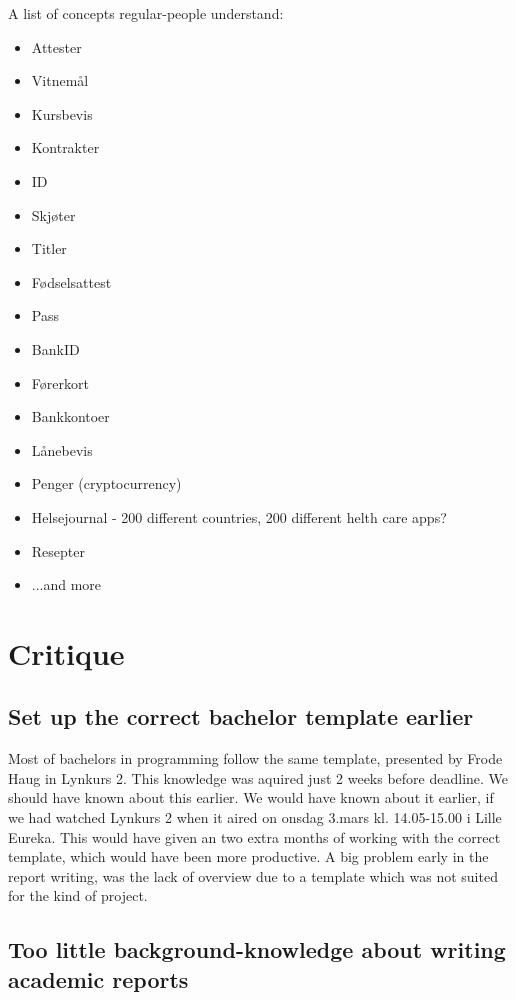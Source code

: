 A list of concepts regular-people understand:
\begin{itemize}
    \item Attester
    \item Vitnemål
    \item Kursbevis
    \item Kontrakter
    \item ID
    \item Skjøter
    \item Titler
    \item Fødselsattest
    \item Pass
    \item BankID
    \item Førerkort
    \item Bankkontoer
    \item Lånebevis
    \item Penger (cryptocurrency)
    \item Helsejournal - 200 different countries, 200 different helth care apps?
    \item Resepter
    \item ...and more
\end{itemize}





\section{Critique}

\subsection{Set up the correct bachelor template earlier}

Most of bachelors in programming follow the same template, presented by Frode Haug in Lynkurs 2. This knowledge was aquired just 2 weeks before deadline. We should have known about this earlier. We would have known about it earlier, if we had watched Lynkurs 2 when it aired on onsdag 3.mars kl. 14.05-15.00 i Lille Eureka. This would have given an two extra months of working with the correct template, which would have been more productive. A big problem early in the report writing, was the lack of overview due to a template which was not suited for the kind of project.



\subsection{Too little background-knowledge about writing academic reports}

